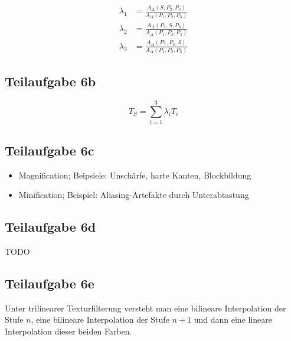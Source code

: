 \documentclass[a4paper]{scrartcl}
\begin{document}
\begin{align}
    \lambda_1 &= \frac{A_\Delta(S, P_2, P_3)}{A_\Delta(P_1, P_2, P_3)}\\
    \lambda_2 &= \frac{A_\Delta(P_1, S, P_3)}{A_\Delta(P_1, P_2, P_3)}\\
    \lambda_3 &= \frac{A_\Delta(P1, P_2, S)}{A_\Delta(P_1, P_2, P_3)}
\end{align}


\subsection*{Teilaufgabe 6b}
\[T_S = \sum_{i=1}^3 \lambda_i T_i\]

\subsection*{Teilaufgabe 6c}
\begin{itemize}
    \item Magnification; Beipsiele: Unschärfe, harte Kanten, Blockbildung
    \item Minification; Beispiel: Aliasing-Artefakte durch Unterabtastung
\end{itemize}

\subsection*{Teilaufgabe 6d}
TODO

\subsection*{Teilaufgabe 6e}
Unter trilinearer Texturfilterung versteht man eine bilineare Interpolation
der Stufe $n$, eine bilineare Interpolation der Stufe $n+1$ und dann eine
lineare Interpolation dieser beiden Farben.
\end{document}
